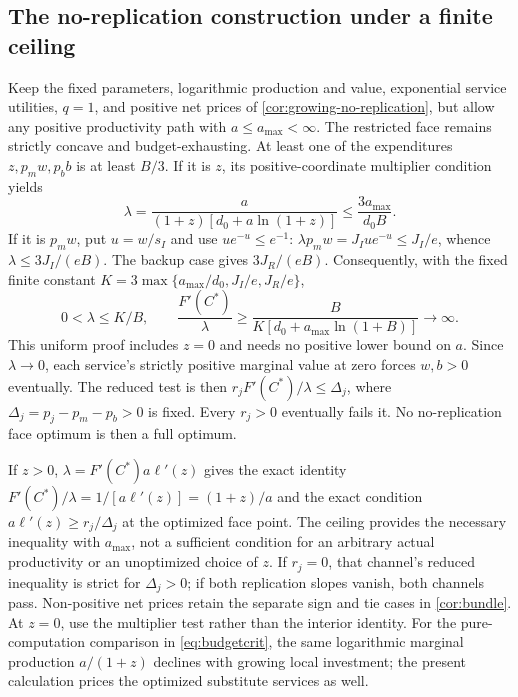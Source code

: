 \documentclass[11pt,a4paper]{article}
\theoremstyle{definition}\newtheorem{definition}{Definition}
\begin{document}
\subsection{The no-replication construction under a finite ceiling}
\label{app:norep-ceiling-proof}
Keep the fixed parameters, logarithmic production and value, exponential
service utilities, $q=1$, and positive net prices of
\cref{cor:growing-no-replication}, but allow any positive productivity
path with $a\leq a_{\max}<\infty$. The restricted face remains strictly
concave and budget-exhausting. At least one of the expenditures
$z,p_mw,p_bb$ is at least $B/3$. If it is $z$, its positive-coordinate
multiplier condition yields
\[
 \lambda=\frac{a}{(1+z)[d_0+a\ln(1+z)]}
 \leq\frac{3a_{\max}}{d_0B}.
\]
If it is $p_mw$, put $u=w/s_I$ and use $u e^{-u}\leq e^{-1}$:
$\lambda p_mw=J_Iu e^{-u}\leq J_I/e$, whence
$\lambda\leq3J_I/(eB)$. The backup case gives $3J_R/(eB)$.
Consequently, with the fixed finite constant
$K=3\max\{a_{\max}/d_0,J_I/e,J_R/e\}$,
\begin{equation}
 0<\lambda\leq K/B,\qquad
 \frac{F'(C^*)}{\lambda}
 \geq\frac{B}{K[d_0+a_{\max}\ln(1+B)]}\longrightarrow\infty.
 \label{eq:norep-ceiling-bound}
\end{equation}
This uniform proof includes $z=0$ and needs no positive lower bound on
$a$. Since $\lambda\to0$, each service's strictly positive marginal
value at zero forces $w,b>0$ eventually. The reduced test is then
$r_jF'(C^*)/\lambda\leq\Delta_j$, where
$\Delta_j=p_j-p_m-p_b>0$ is fixed. Every $r_j>0$ eventually fails it.
No no-replication face optimum is then a full optimum.

If $z>0$, $\lambda=F'(C^*)a\ell'(z)$ gives the exact identity
$F'(C^*)/\lambda=1/[a\ell'(z)]=(1+z)/a$ and the exact condition
$a\ell'(z)\geq r_j/\Delta_j$ at the optimized face point.
The ceiling provides the necessary inequality with $a_{\max}$, not a
sufficient condition for an arbitrary actual productivity or an
unoptimized choice of $z$. If $r_j=0$, that channel's reduced inequality
is strict for $\Delta_j>0$; if both replication slopes vanish, both
channels pass. Non-positive net prices retain the separate sign and tie
cases in \cref{cor:bundle}. At $z=0$, use the multiplier test rather than
the interior identity. For the pure-computation comparison in
\cref{eq:budgetcrit}, the same logarithmic marginal production
$a/(1+z)$ declines with growing local investment; the present calculation
prices the optimized substitute services as well.
\end{document}
